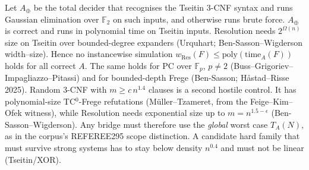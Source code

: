 \documentclass[11pt]{article}
\begin{document}
\begin{proposition}\label{p4}
Let $A_{\oplus}$ be the total decider that recognises the Tseitin 3-CNF syntax and runs Gaussian elimination
over $\mathbb F_2$ on such inputs, and otherwise runs brute force. $A_\oplus$ is correct and runs in
polynomial time on Tseitin inputs. Resolution needs $2^{\Omega(n)}$ size on Tseitin over bounded-degree
expanders (Urquhart; Ben-Sasson--Wigderson width--size). Hence no instancewise simulation
$w_{\mathrm{Res}}(F)\le\mathrm{poly}(\mathrm{time}_A(F))$ holds for all correct $A$. The same holds for
PC over $\mathbb F_p$, $p\neq2$ (Buss--Grigoriev--Impagliazzo--Pitassi) and for bounded-depth Frege
(Ben-Sasson; H\aa stad--Risse 2025).
Random 3-CNF with $m\ge c\,n^{1.4}$ clauses is a second hostile control. It has polynomial-size
TC$^0$-Frege refutations (M\"uller--Tzameret, from the Feige--Kim--Ofek witness), while Resolution needs
exponential size up to $m=n^{1.5-\epsilon}$ (Ben-Sasson--Wigderson). Any bridge must therefore use the
\emph{global} worst case $T_A(N)$, as in the corpus's REFEREE295 scope distinction. A candidate hard
family that must survive strong systems has to stay below density $n^{0.4}$ and must not be linear
(Tseitin/XOR).
\end{proposition}
\end{document}
